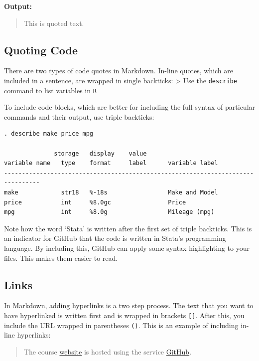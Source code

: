 \documentclass[]{book}
\theoremstyle{definition}
\theoremstyle{definition}
\theoremstyle{definition}
\theoremstyle{remark}
\begin{document}
\textbf{Output:}

\begin{quote}
This is quoted text.
\end{quote}

\subsection{Quoting Code}\label{quoting-code}

There are two types of code quotes in Markdown. In-line quotes, which
are included in a sentence, are wrapped in single backticks:
\textgreater{} Use the \texttt{describe} command to list variables in
\texttt{R}

To include code blocks, which are better for including the full syntax
of particular commands and their output, use triple backticks:

\begin{verbatim}
. describe make price mpg

              storage   display    value
variable name   type    format     label      variable label
--------------------------------------------------------------------------------
make            str18   %-18s                 Make and Model
price           int     %8.0gc                Price
mpg             int     %8.0g                 Mileage (mpg)
\end{verbatim}

Note how the word `Stata' is written after the first set of triple
backticks. This is an indicator for GitHub that the code is written in
Stata's programming language. By including this, GitHub can apply some
syntax highlighting to your files. This makes them easier to read.

\subsection{Links}\label{links}

In Markdown, adding hyperlinks is a two step process. The text that you
want to have hyperlinked is written first and is wrapped in brackets
\texttt{{[}{]}}. After this, you include the URL wrapped in parentheses
\texttt{()}. This is an example of including in-line hyperlinks:

\begin{quote}
The course \href{https://github.com/slu-soc5050}{website} is hosted
using the service \href{https://github.com}{GitHub}.
\end{quote}
\end{document}
